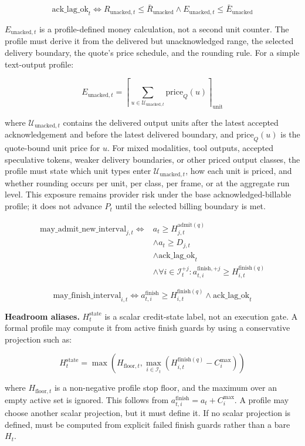 \documentclass[11pt]{article}
\newcommand{\field}[1]{\texttt{\detokenize{#1}}}
\begin{document}
\[
\mathrm{ack\_lag\_ok}_t
\iff
R_{\mathrm{unacked},t} \leq \bar{R}_{\mathrm{unacked}}
\land
E_{\mathrm{unacked},t} \leq \bar{E}_{\mathrm{unacked}}
\]

\(E_{\mathrm{unacked},t}\) is a profile-defined money calculation, not a second unit counter. The profile must derive it from the delivered but unacknowledged range, the selected delivery boundary, the quote's price schedule, and the rounding rule. For a simple text-output profile:

\[
E_{\mathrm{unacked},t}
=
\left\lceil
\sum_{u \in \mathcal{U}_{\mathrm{unacked},t}}
\mathrm{price}_{Q}(u)
\right\rceil_{\mathrm{unit}}
\]

where \(\mathcal{U}_{\mathrm{unacked},t}\) contains the delivered output units after the latest accepted acknowledgement and before the latest delivered boundary, and \(\mathrm{price}_{Q}(u)\) is the quote-bound unit price for \(u\). For mixed modalities, tool outputs, accepted speculative tokens, weaker delivery boundaries, or other priced output classes, the profile must state which unit types enter \(\mathcal{U}_{\mathrm{unacked},t}\), how each unit is priced, and whether rounding occurs per unit, per class, per frame, or at the aggregate run level. This exposure remains provider risk under the base acknowledged-billable profile; it does not advance \(P_t\) until the selected billing boundary is met.

\[
\begin{aligned}
\mathrm{may\_admit\_new\_interval}_{j,t} \iff
{}&a_t \geq H_{j,t}^{\mathrm{admit}(q)}\\
&\land a_t \geq D_{j,t}\\
&\land \mathrm{ack\_lag\_ok}_t\\
&\land \forall i \in \mathcal{I}_t^{+j}:
a_{t,i}^{\mathrm{finish},+j} \geq H_{i,t}^{\mathrm{finish}(q)}
\end{aligned}
\]

\[
\mathrm{may\_finish\_interval}_{i,t} \iff a_{t,i}^{\mathrm{finish}} \geq H_{i,t}^{\mathrm{finish}(q)} \land \mathrm{ack\_lag\_ok}_t
\]

\textbf{Headroom aliases.} \(H_t^{\mathrm{state}}\) is a scalar credit-state label, not an execution gate. A formal profile may compute it from active finish guards by using a conservative projection such as:

\[
H_t^{\mathrm{state}} =
\max\left(
H_{\mathrm{floor},t},
\max_{i\in\mathcal{I}_t}
\left(H_{i,t}^{\mathrm{finish}(q)}-C_i^{\max}\right)
\right)
\]

where \(H_{\mathrm{floor},t}\) is a non-negative profile stop floor, and the maximum over an empty active set is ignored. This follows from \(a_{t,i}^{\mathrm{finish}}=a_t+C_i^{\max}\). A profile may choose another scalar projection, but it must define it. If no scalar projection is defined, \field{credit_stopped} must be computed from explicit failed finish guards rather than a bare \(H_t\).
\end{document}
